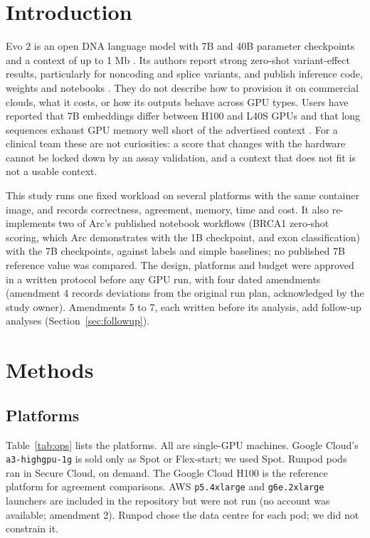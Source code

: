 \documentclass[11pt]{article}
\newcommand{\code}[1]{\texttt{#1}}
\begin{document}
\section{Introduction}
Evo 2 is an open DNA language model with 7B and 40B parameter checkpoints and a context of up to
1 Mb \cite{brixi2026}. Its authors report strong zero-shot variant-effect results, particularly for
noncoding and splice variants, and publish inference code, weights and notebooks \cite{arcrepo}.
They do not describe how to provision it on commercial clouds, what it costs, or how its outputs
behave across GPU types. Users have reported that 7B embeddings differ between H100 and L40S GPUs
\cite{arc177} and that long sequences exhaust GPU memory well short of the advertised context
\cite{arc160}. For a clinical team these are not curiosities: a score that changes with the
hardware cannot be locked down by an assay validation, and a context that does not fit is not a
usable context.

This study runs one fixed workload on several platforms with the same container image, and records
correctness, agreement, memory, time and cost. It also re-implements two of Arc's published notebook
workflows (BRCA1 zero-shot scoring, which Arc demonstrates with the 1B checkpoint, and exon
classification) with the 7B checkpoints, against labels and simple baselines; no published 7B
reference value was compared. The design, platforms and budget were approved in a written
protocol before any GPU run, with four dated amendments (amendment 4 records deviations from the
original run plan, acknowledged by the study owner). Amendments 5 to 7, each written before its
analysis, add follow-up analyses (Section~\ref{sec:followup}).

\section{Methods}
\subsection{Platforms}
Table~\ref{tab:ops} lists the platforms. All are single-GPU machines. Google Cloud's
\code{a3-highgpu-1g} is sold only as Spot or Flex-start; we used Spot. Runpod pods ran in Secure
Cloud, on demand. The Google Cloud H100 is the reference platform for agreement comparisons. AWS
\code{p5.4xlarge} and \code{g6e.2xlarge} launchers are included in the repository but were not run
(no account was available; amendment 2). Runpod chose the data centre for each pod; we did not
constrain it.
\end{document}
